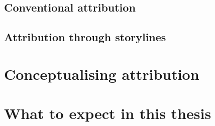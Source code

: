 \subsection{Conventional attribution}

  \blindtext

\subsection{Attribution through storylines}

  \blindtext

\section{Conceptualising attribution}

  \blindtext

\section{What to expect in this thesis}

  \blindtext